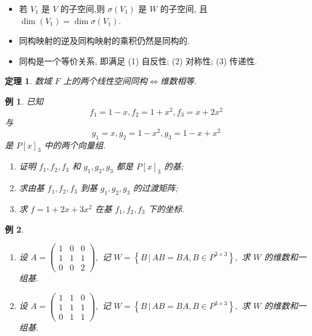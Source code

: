 \documentclass[13pt]{beamer}
\newtheorem{thm}{定理}
\newtheorem{exa}{例}
\def\dim{\operatorname{dim}}
\begin{document}
\begin{frame}
\begin{itemize}

\item 若 $V_{1}$ 是 $V$ 的子空间,则 $\sigma \left(V_{1}\right)$ 是 $W$ 的子空间, 且 $\dim (V_1) =\dim \sigma \left(V_{1}\right)$.

\item 同构映射的逆及同构映射的乘积仍然是同构的.

\item  同构是一个等价关系, 即满足
        (1) 自反性; 
        (2) 对称性; 
        (3) 传递性. 
\end{itemize}
\begin{thm}
数域 $F$ 上的两个线性空间同构$\Leftrightarrow$维数相等.
\end{thm}
\end{frame}

\setcounter{exa}{0}
\begin{frame}

\begin{exa}
 已知 $$f_{1}=1-x, f_{2}=1+x^{2}, f_{3}=x+2 x^{2}$$ 与 $$g_{1}=x, g_{2}=1-x^{2}, g_{3}=1-x+x^{2}$$ 是 $P[x]_{3}$ 中的两个向量组.
 \begin{enumerate}
\item 证明 $f_{1}, f_{2}, f_{3}$ 和 $g_{1}, g_{2}, g_{3}$ 都是 $P[x]_{3}$ 的基;
\item 求由基 $f_{1}, f_{2}, f_{3}$ 到基 $g_{1}, g_{2}, g_{3}$ 的过渡矩阵;
\item 求 $f=1+2 x+3 x^{2}$ 在基 $f_{1}, f_{2}, f_{3}$ 下的坐标.
 \end{enumerate}

\end{exa}
\end{frame}

\begin{frame}
\small{\begin{exa}
\begin{enumerate}
\item 设 $A=\left(\begin{array}{ccc}1 & 0 & 0 \\ 1 & 1 & 1 \\ 0 & 0 & 2\end{array}\right),$ 记 $W=\left\{B\, |\, A B=B A, B \in P^{3 \times 3}\right\},$ 求 $W$ 的维数和一组基.
\item 设 $A=\left(\begin{array}{ccc}1 & 1 & 0 \\ 1 & 1 & 1 \\ 0 & 1 & 1\end{array}\right),$ 记 $W=\left\{B\, |\, A B=B A, B \in P^{3 \times 3}\right\},$ 求 $W$ 的维数和一组基.
\end{enumerate}
\end{exa}}
\end{frame}
\end{document}
